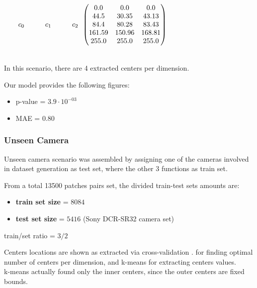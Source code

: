 		$\begin{matrix}  \qquad  c_0 \quad  \qquad c_1 \quad  \qquad c_2 \end{matrix}\\
				
		
		\begin{pmatrix}
				     0.0 &     0.0 &    0.0\\
					44.5 &   30.35 &    43.13 \\
					84.4 &   80.28 &    83.43 \\
					161.59 &   150.96 &   168.81\\
		     		 255.0 &  255.0 &   255.0 \\
				\end{pmatrix}$\\
$ $

		In this scenario, there are 4 extracted centers per dimension.

	
	Our model provides the following figures:

	\begin{itemize}
	\item 	p-value = $3.9 \cdot 10 ^{-03}$
	\item 	MAE = $0.80$
	
	\end{itemize}


\subsubsection{Unseen Camera}

Unseen camera scenario was assembled by assigning one of the cameras involved in dataset generation as test set, where the other 3 functions as train set.


	
		From a total 13500 patches pairs set, the divided train-test sets amounts are:
		\begin{itemize}
			\item \textbf{train set size} = $8084$ 
			\item \textbf{test set size} = $5416$ (Sony DCR-SR32 camera set)
		\end{itemize}
		
		train/set ratio = $3/2$

	
	Centers locations are shown as extracted via cross-validation \cite{cross_val}. for finding optimal number of centers per dimension, and k-means for extracting centers values. \\
	k-means actually found only the inner centers, since the outer centers are fixed bounds.


